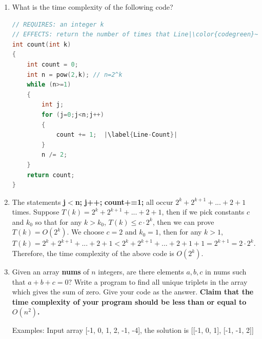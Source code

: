 \documentclass[12pt,a4paper]{article}
\makeatletter
\newtheorem*{solution}{Solution}
\theoremstyle{definition}
\renewenvironment{solution}[1][Solution] {\par\pushQED{\qed}\normalfont\topsep6\p@\@plus6\p@\relax\trivlist\item[\hskip\labelsep\bfseries#1\@addpunct{.}]\ignorespaces}{\popQED\endtrivlist\@endpefalse} \makeatother
\makeatother
\begin{document}
\begin{enumerate}

\item What is the time complexity of the following code?


\begin{lstlisting}[language=C++]
// REQUIRES: an integer k
// EFFECTS: return the number of times that Line|\color{codegreen}~\ref{Line-Count}| is executed
int count(int k)
{
	int count = 0;
	int n = pow(2,k); // n=2^k
	while (n>=1)
	{
		int j;
   		for (j=0;j<n;j++)
   		{
   			count += 1;  |\label{Line-Count}|	
   		}
   		n /= 2;
	}
	return count;
}
\end{lstlisting}



\begin{solution}
The statements \textbf{j$<$n;} \textbf{j++;} \textbf{count+=1;} all occur $2^k+2^{k+1}+...+2+1$ times.
Suppose $T(k)=2^k+2^{k+1}+...+2+1$, then if we pick constants $c$ and $k_0$ so that for any $k>k_0$, $T(k)\leq c\cdot 2^k$, then we can prove $T(k)=O(2^k)$.
We choose $c=2$ and $k_0=1$, then for any $k>1$, $T(k)=2^k+2^{k+1}+...+2+1<2^k+2^{k+1}+...+2+1+1=2^{k+1}=2\cdot 2^k$.
Therefore, the time complexity of the above code is $O(2^k)$.
\end{solution}


\item Given an array \textbf{nums} of $n$ integers, are there elements $a, b, c$ in nums such that $a + b + c = 0?$ Write a program to find all unique triplets in the array which gives the sum of zero. Give your code as the answer. \textbf{Claim that the time complexity of your program should be less than or equal to $O(n^2)$.}

{\color{purple}Examples: Input array [-1, 0, 1, 2, -1, -4], the solution is [[-1, 0, 1], [-1, -1, 2]]}




\end{enumerate}
\end{document}
